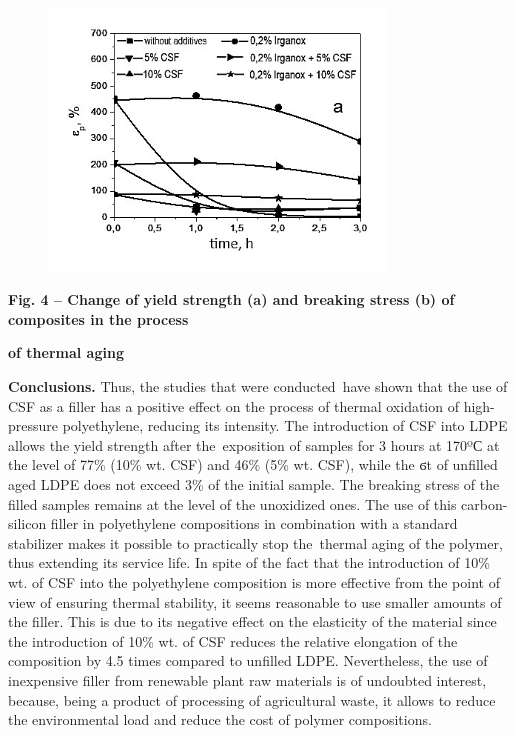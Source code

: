 \begin{figure}[H]
	\centering
	\includegraphics[width=0.8\textwidth]{media/chem/image24}
	\caption*{}
\end{figure}


{\bfseries Fig. 4 -- Change of yield strength (a) and breaking stress (b)
of composites in the process}

{\bfseries of thermal aging}

{\bfseries Conclusions.} Thus, the studies that were conducted~have shown
that the use of CSF as a filler has a positive effect on the process of
thermal oxidation of high-pressure polyethylene, reducing its intensity.
The introduction of CSF into LDPE allows the yield strength after
the~exposition of samples for 3 hours at 170ºС at the level of 77\%
(10\% wt. CSF) and 46\% (5\% wt. CSF), while the ϭt of unfilled aged
LDPE does not exceed 3\% of the initial sample. The breaking stress of
the filled samples remains at the level of the unoxidized ones. The use
of this carbon-silicon filler in polyethylene compositions in
combination with a standard stabilizer makes it possible to practically
stop the~thermal aging of the polymer, thus extending its service life.
In spite of the fact that the introduction of 10\% wt. of CSF into the
polyethylene composition is more effective from the point of view of
ensuring thermal stability, it seems reasonable to use smaller amounts
of the filler. This is due to its negative effect on the elasticity of
the material since the introduction of 10\% wt. of CSF reduces the
relative elongation of the composition by 4.5 times compared to unfilled
LDPE. Nevertheless, the use of inexpensive filler from renewable plant
raw materials is of undoubted interest, because, being a product of
processing of agricultural waste, it allows to reduce the environmental
load and reduce the cost of polymer compositions.

